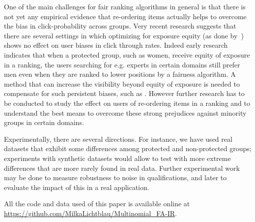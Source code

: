 One of the main challenges for fair ranking algorithms in general is that there is not yet any empirical evidence that re-ordering items actually helps to overcome the bias in click-probability across groups.
%
Very recent research  suggests that there are several settings in which optimizing for exposure equity (as done by~\cite{biega2018equity, singh2019policy}) shows no effect on user biases in click through rates. 
%
Indeed early research indicates that when a protected group, such as women, receive equity of exposure in a ranking, the users searching for e.g. experts in certain domains still prefer men even when they are ranked to lower positions by a fairness algorithm.
%
A method that can increase the visibility beyond equity of exposure is needed to compensate for such persistent biases, such as \algoFAIR.
%
However further research has to be conducted to study the effect on users of re-ordering items in a ranking and to understand the best means to overcome these strong prejudices against minority groups in certain domains.

Experimentally, there are several directions. 
%
For instance, we have used real datasets that exhibit some differences among protected and non-protected groups; experiments with synthetic datasets would allow to test with more extreme differences that are more rarely found in real data.
%
Further experimental work may be done to measure robustness to noise in qualifications, and later to evaluate the impact of this in a real application.

All the code and data used of this paper is available online at \url{https://github.com/MilkaLichtblau/Multinomial_FA-IR}.
